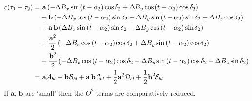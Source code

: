 	\begin{equation}
	\begin{split}
		c(\tau_1-\tau_2) =&~ \textbf{a}\left(-\Delta B_x\sin\left(t-\alpha_2\right)\cos\delta_2 +\Delta B_y\cos\left(t-\alpha_2\right)\cos\delta_2\right)	\\
					     &+ \textbf{b}\left(-\Delta B_x\cos\left(t-\alpha_2\right)\sin\delta_2 +\Delta B_y\sin\left(t-\alpha_2\right)\sin\delta_2 + \Delta B_z\cos\delta_2\right) \\
					     &+ \textbf{a\,b}\left(\Delta B_x\sin\left(t-\alpha_2\right)\sin\delta_2-\Delta B_y\cos\left(t-\alpha_2\right)\sin\delta_2\right) \\
					     &+ \frac{\textbf{a}^2}{2}\left(-\Delta B_x\cos\left(t-\alpha_2\right)\cos\delta_2+\Delta B_y\sin\left(t-\alpha_2\right)\cos\delta_2 \right) \\
    				     &+ \frac{\textbf{b}^2}{2}\left(-\Delta B_x\cos\left(t-\alpha_2\right)\cos\delta_2+\Delta B_y\sin\left(t-\alpha_2\right)\cos\delta_2 - \Delta B_z\sin\delta_2\right) \\
    				     =&~ \textbf{a}\mathcal{A}_{bl} + \textbf{b}\mathcal{B}_{bl} + \textbf{a\,b}\,\mathcal{C}_{bl} + \frac{1}{2}\textbf{a}^2\mathcal{D}_{bl} + \frac{1}{2}\textbf{b}^2\mathcal{E}_{bl}
	\end{split}
	\label{eq:baselineerrorfull}
	\end{equation} If $\textbf{a}$, $\textbf{b}$ are `small' then the $O^2$ terms are comparatively reduced.

